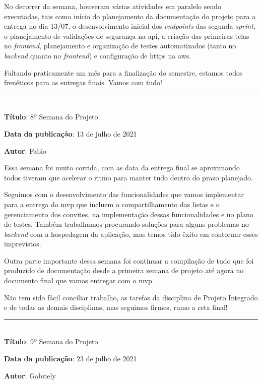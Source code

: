 No decorrer da semana, houveram várias atividades em paralelo sendo executadas, tais como início do planejamento da documentação do projeto para a entrega no dia 13/07, o desenvolvimento inicial dos \textit{endpoints} das segunda \textit{\gls{sprint}}, o planejamento de validações de segurança na \gls{api}, a criação das primeiras telas no \textit{\gls{frontend}}, planejamento e organização de testes automatizados (tanto no \textit{\gls{backend}} quanto no \textit{\gls{frontend}}) e configuração de \gls{https} na \gls{aws}.

Faltando praticamente um mês para a finalização do semestre, estamos todos frenéticos para as entregas finais. Vamos com tudo!\\

\protect\rule{13cm}{.5pt}
\\

\textbf{Título}: 8º Semana do Projeto

\textbf{Data da publicação}: 13 de julho de 2021

\textbf{Autor}: Fabio

Essa semana foi muito corrida, com as data da entrega final se aproximando todos tiveram que acelerar o ritmo para manter tudo dentro do prazo planejado.

Seguimos com o desenvolvimento das funcionalidades que vamos implementar para a entrega do \gls{mvp} que incluem o compartilhamento das listas e o gerenciamento dos convites, na implementação dessas funcionalidades e no plano de testes. Também trabalhamos procurando soluções para alguns problemas no \textit{\gls{backend}} com a hospedagem da aplicação, mas temos tido êxito em contornar esses imprevistos.

Outra parte importante dessa semana foi continuar a compilação de tudo que foi produzido de documentação desde a primeira semana de projeto até agora no documento final que vamos entregar com o \gls{mvp}.

Não tem sido fácil conciliar trabalho, as tarefas da disciplina de Projeto Integrado e de todas as demais disciplinas, mas seguimos firmes, rumo a reta final! \\

\protect\rule{13cm}{.5pt}
\\

\textbf{Título}: 9º Semana do Projeto

\textbf{Data da publicação}: 23 de julho de 2021

\textbf{Autor}: Gabriely

